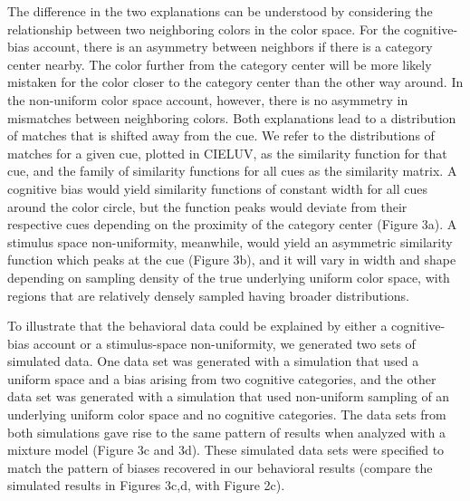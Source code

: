 \documentclass[9pt,biorxiv,lineno,onehalfspacing]{lapreprint}
\begin{document}
\begin{refsection}
The difference in the two explanations can be understood by considering the relationship between two neighboring colors in the color space. 
For the cognitive-bias account, there is an asymmetry between neighbors if there is a category center nearby. 
The color further from the category center will be more likely mistaken for the color closer to the category center than the other way around. 
In the non-uniform color space account, however, there is no asymmetry in mismatches between neighboring colors. 
Both explanations lead to a distribution of matches that is shifted away from the cue. 
We refer to the distributions of matches for a given cue, plotted in CIELUV, as the similarity function for that cue, and the family of similarity functions for all cues as the similarity matrix.
A cognitive bias would yield similarity functions of constant width for all cues around the color circle, but the function peaks would deviate from their respective cues depending on the proximity of the category center (Figure 3a). 
A stimulus space non-uniformity, meanwhile, would yield an asymmetric similarity function which peaks at the cue (Figure 3b), and it will vary in width and shape depending on sampling density of the true underlying uniform color space, with regions that are relatively densely sampled having broader distributions.

To illustrate that the behavioral data could be explained by either a cognitive-bias account or a stimulus-space non-uniformity, we generated two sets of simulated data.
One data set was generated with a simulation that used a uniform space and a bias arising from two cognitive categories, and the other data set was generated with a simulation that used non-uniform sampling of an underlying uniform color space and no cognitive categories. 
The data sets from both simulations gave rise to the same pattern of results when analyzed with a mixture model \citep{zhang_discrete_2008, bae_why_2015} (Figure 3c and 3d). 
These simulated data sets were specified to match the pattern of biases recovered in our behavioral results (compare the simulated results in Figures 3c,d, with Figure 2c). 


\end{refsection}
\end{document}
